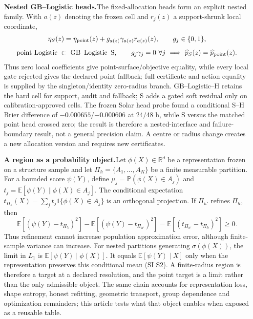 \documentclass[10pt]{article}
\newcommand{\R}{\mathbb{R}}
\newcommand{\E}{\mathbb{E}}
\newcommand{\Prob}{\mathbb{P}}
\begin{document}
\textbf{Nested GB--Logistic heads.}\;The fixed-allocation heads form an explicit nested family. With $a(z)$ denoting the frozen cell and $r_j(z)$ a support-shrunk local coordinate,
\[
\eta_S(z)=\eta_{\rm point}(z)+g_{a(z)}\gamma_{a(z)}r_{a(z)}(z),\qquad g_j\in\{0,1\},
\]
\[
\text{point Logistic}\;\subset\;\text{GB--Logistic--S},\qquad
 g_j\gamma_j=0\ \forall j\ \Longrightarrow\ \widehat p_S(z)=\widehat p_{\rm point}(z).
\]
\noindent Thus zero local coefficients give point-surface/objective equality, while every local gate rejected gives the declared point fallback; full certificate and action equality is supplied by the singleton/identity zero-radius branch. GB--Logistic--H retains the hard cell for support, audit and fallback; S adds a gated soft residual only on calibration-approved cells. The frozen Solar head probe found a conditional S--H Brier difference of $-0.000655$/$-0.000606$ at 24/48 h, while S versus the matched point head crossed zero; the result is therefore a nested-interface and failure-boundary result, not a general precision claim. A centre or radius change creates a new allocation version and requires new certificates.

\textbf{A region as a probability object.}\;Let $\phi(X)\in\R^d$ be a representation frozen on a structure sample and let $\Pi_h=\{A_1,\ldots,A_K\}$ be a finite measurable partition. For a bounded score $\psi(Y)$, define $\mu_j=\Prob(\phi(X)\in A_j)$ and $t_j=\E[\psi(Y)\mid \phi(X)\in A_j]$. The conditional expectation $t_{\Pi_h}(X)=\sum_jt_j1\{\phi(X)\in A_j\}$ is an orthogonal projection. If $\Pi_{h'}$ refines $\Pi_h$, then
\[
\E[(\psi(Y)-t_{\Pi_h})^2]-\E[(\psi(Y)-t_{\Pi_{h'}})^2]=\E[(t_{\Pi_{h'}}-t_{\Pi_h})^2]\geq0.
\]
Thus refinement cannot increase population approximation error, although finite-sample variance can increase. For nested partitions generating $\sigma(\phi(X))$, the limit in $L_1$ is $\E[\psi(Y)\mid\phi(X)]$. It equals $\E[\psi(Y)\mid X]$ only when the representation preserves this conditional mean (SI S2). A finite-radius region is therefore a target at a declared resolution, and the point target is a limit rather than the only admissible object. The same chain accounts for representation loss, shape entropy, honest refitting, geometric transport, group dependence and optimization remainders; this article tests what that object enables when exposed as a reusable table.
\end{document}
